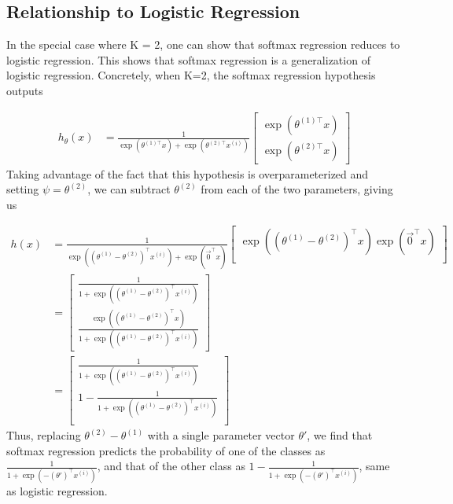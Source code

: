 \subsection{Relationship to Logistic Regression}

In the special case where K = 2, one can show that softmax regression reduces to logistic regression. This shows that softmax regression is a generalization of logistic regression. Concretely, when K=2, the softmax regression hypothesis outputs

\begin{align} 
	h_\theta(x) &= \frac{1}{ \exp(\theta^{(1)\top}x) + \exp( \theta^{(2)\top} x^{(i)} ) } \begin{bmatrix} \exp( \theta^{(1)\top} x ) \\ \exp( \theta^{(2)\top} x ) \end{bmatrix} 
\end{align}
Taking advantage of the fact that this hypothesis is overparameterized and setting $\psi = \theta^{(2)}$, we can subtract $\theta^{(2)}$ from each of the two parameters, giving us

\begin{align} h(x) &= \frac{1}{ \exp( (\theta^{(1)}-\theta^{(2)})^\top x^{(i)} ) + \exp(\vec{0}^\top x) } \begin{bmatrix} \exp( (\theta^{(1)}-\theta^{(2)})^\top x ) \exp( \vec{0}^\top x ) \\ \end{bmatrix} \\ &= \begin{bmatrix} \frac{1}{ 1 + \exp( (\theta^{(1)}-\theta^{(2)})^\top x^{(i)} ) } \\ \frac{\exp( (\theta^{(1)}-\theta^{(2)})^\top x )}{ 1 + \exp( (\theta^{(1)}-\theta^{(2)})^\top x^{(i)} ) } \end{bmatrix} \\ &= \begin{bmatrix} \frac{1}{ 1 + \exp( (\theta^{(1)}-\theta^{(2)})^\top x^{(i)} ) } \\ 1 - \frac{1}{ 1 + \exp( (\theta^{(1)}-\theta^{(2)})^\top x^{(i)} ) } \\ \end{bmatrix} 
\end{align}
Thus, replacing $\theta^{(2)}-\theta^{(1)}$ with a single parameter vector $\theta'$, we find that softmax regression predicts the probability of one of the classes as $\frac{1}{ 1 + \exp(- (\theta')^\top x^{(i)} ) }$, and that of the other class as $1 - \frac{1}{ 1 + \exp(- (\theta')^\top x^{(i)} ) }$, same as logistic regression.



